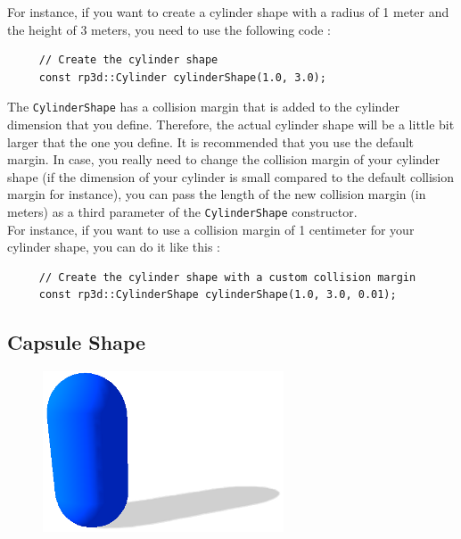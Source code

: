 \documentclass[a4paper,12pt]{article}
\begin{document}
    For instance, if you want to create a cylinder shape with a radius of 1 meter and the height of 3 meters, you need to use the following code : \\

    \begin{lstlisting}
     // Create the cylinder shape
     const rp3d::Cylinder cylinderShape(1.0, 3.0);
  \end{lstlisting}

    \vspace{0.6cm}

    The \texttt{CylinderShape} has a collision margin that is added to the cylinder dimension that you define. Therefore, the actual cylinder shape will be a little bit larger that the one you define.
    It is recommended that you use the default margin. In case, you really need to change the collision margin of your cylinder shape (if the dimension of your cylinder is small compared
    to the default collision margin for instance), you can pass the length of the new collision margin (in meters) as a third parameter of the \texttt{CylinderShape} constructor. \\

    For instance, if you want to use a collision margin of 1 centimeter for your cylinder shape, you can do it like this : \\

   \begin{lstlisting}
     // Create the cylinder shape with a custom collision margin
     const rp3d::CylinderShape cylinderShape(1.0, 3.0, 0.01);
  \end{lstlisting}

    \subsection{Capsule Shape}

    \begin{figure}[h]
        \centering
        \includegraphics{capsuleshape.png}
        \label{fig:capsuleshape}
    \end{figure}
\end{document}
